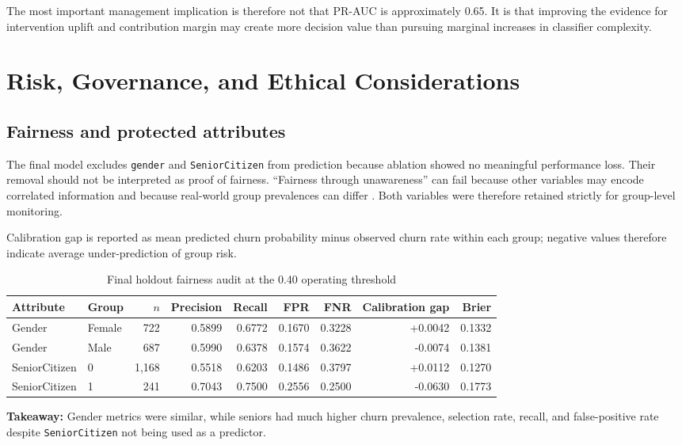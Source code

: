 \documentclass[11pt]{article}
\newcommand{\takeaway}[1]{\vspace{1pt}\noindent\textbf{Takeaway:} #1\vspace{3pt}}
\newcommand{\code}[1]{\texttt{#1}}
\begin{document}
The most important management implication is therefore not that PR-AUC is approximately 0.65. It is that improving the evidence for intervention uplift and contribution margin may create more decision value than pursuing marginal increases in classifier complexity.

\section{Risk, Governance, and Ethical Considerations}

\subsection{Fairness and protected attributes}

The final model excludes \code{gender} and \code{SeniorCitizen} from prediction because ablation showed no meaningful performance loss. Their removal should not be interpreted as proof of fairness. ``Fairness through unawareness'' can fail because other variables may encode correlated information and because real-world group prevalences can differ \citep{fazelpour2021}. Both variables were therefore retained strictly for group-level monitoring.

Calibration gap is reported as mean predicted churn probability minus observed churn rate within each group; negative values therefore indicate average under-prediction of group risk.

\begin{table}[H]
\centering\scriptsize
\caption{Final holdout fairness audit at the 0.40 operating threshold}
\begin{tabular}{llrrrrrrr}
\toprule
Attribute & Group & $n$ & Precision & Recall & FPR & FNR & Calibration gap & Brier \\
\midrule
Gender & Female & 722 & 0.5899 & 0.6772 & 0.1670 & 0.3228 & +0.0042 & 0.1332 \\
Gender & Male & 687 & 0.5990 & 0.6378 & 0.1574 & 0.3622 & -0.0074 & 0.1381 \\
SeniorCitizen & 0 & 1,168 & 0.5518 & 0.6203 & 0.1486 & 0.3797 & +0.0112 & 0.1270 \\
SeniorCitizen & 1 & 241 & 0.7043 & 0.7500 & 0.2556 & 0.2500 & -0.0630 & 0.1773 \\
\bottomrule
\end{tabular}
\end{table}
\takeaway{Gender metrics were similar, while seniors had much higher churn prevalence, selection rate, recall, and false-positive rate despite \code{SeniorCitizen} not being used as a predictor.}
\end{document}
